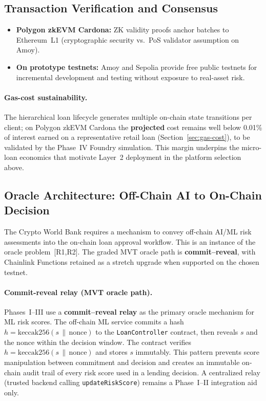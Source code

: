 \documentclass[12pt,a4paper]{report}
\begin{document}
\subsection{Transaction Verification and Consensus}

\begin{itemize}[noitemsep]
\item \textbf{Polygon zkEVM Cardona:} ZK validity proofs anchor batches to Ethereum~L1 (cryptographic security vs.\ PoS validator assumption on Amoy).
\item \textbf{On prototype testnets:} Amoy and Sepolia provide free public testnets for incremental development and testing without exposure to real-asset risk.
\end{itemize}

\paragraph{Gas-cost sustainability.}
The hierarchical loan lifecycle generates multiple on-chain state transitions per client; on Polygon zkEVM Cardona the \textbf{projected} cost remains well below 0.01\% of interest earned on a representative retail loan (Section~\ref{sec:gas-cost}), to be validated by the Phase~IV Foundry simulation. This margin underpins the micro-loan economics that motivate Layer~2 deployment in the platform selection above.

\subsection{Oracle Architecture: Off-Chain AI to On-Chain Decision}
\label{sec:oracle-architecture}

The Crypto World Bank requires a mechanism to convey off-chain AI/ML risk assessments into the on-chain loan approval workflow. This is an instance of the oracle problem~[R1,R2]. The graded MVT oracle path is \textbf{commit--reveal}, with Chainlink Functions retained as a stretch upgrade when supported on the chosen testnet.

\paragraph{Commit-reveal relay (MVT oracle path).}
Phases~I--III use a \textbf{commit--reveal relay} as the primary oracle mechanism for ML risk scores. The off-chain ML service commits a hash $h = \text{keccak256}(s \,\|\, \text{nonce})$ to the \texttt{LoanController} contract, then reveals $s$ and the nonce within the decision window. The contract verifies $h = \text{keccak256}(s \,\|\, \text{nonce})$ and stores $s$ immutably. This pattern prevents score manipulation between commitment and decision and creates an immutable on-chain audit trail of every risk score used in a lending decision. A centralized relay (trusted backend calling \texttt{updateRiskScore}) remains a Phase~I--II integration aid only.
\end{document}
